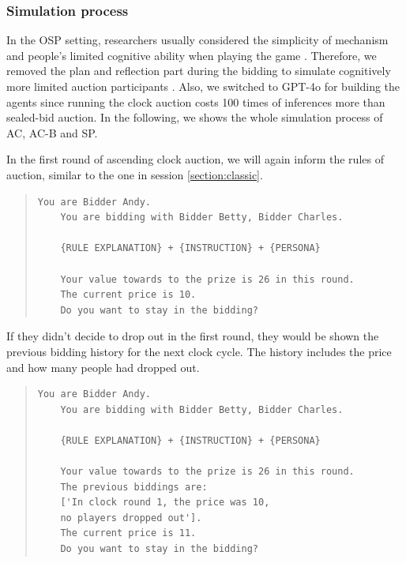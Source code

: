 \documentclass{article} %
\begin{document}
\subsubsection{Simulation process}



In the OSP setting, researchers usually considered the simplicity of mechanism and people's limited cognitive ability when playing the game \cite{li2017obviously}. 
Therefore, we removed the plan and reflection part during the bidding to simulate cognitively more limited auction participants \cite{raman2024steerassessingeconomicrationality}. Also, we switched to GPT-4o for building the agents since running the clock auction costs 100 times of inferences more than sealed-bid auction.
In the following, we shows the whole simulation process of AC, AC-B and SP. 

In the first round of ascending clock auction, we will again inform the rules of auction, similar to the one in session \ref{section:classic}. 

\begin{quote}
\begin{lstlisting}[basicstyle=\ttfamily]
    You are Bidder Andy.            
    You are bidding with Bidder Betty, Bidder Charles.     
    
    {RULE EXPLANATION} + {INSTRUCTION} + {PERSONA} 

    Your value towards to the prize is 26 in this round.
    The current price is 10. 
    Do you want to stay in the bidding?
\end{lstlisting}
\end{quote}

If they didn't decide to drop out in the first round, they would be shown the previous bidding history for the next clock cycle. The history includes the price and how many people had dropped out.
\begin{quote}
\begin{lstlisting}[basicstyle=\ttfamily]
    You are Bidder Andy.            
    You are bidding with Bidder Betty, Bidder Charles.     
    
    {RULE EXPLANATION} + {INSTRUCTION} + {PERSONA} 

    Your value towards to the prize is 26 in this round.
    The previous biddings are: 
    ['In clock round 1, the price was 10, 
    no players dropped out'].
    The current price is 11. 
    Do you want to stay in the bidding?
\end{lstlisting}
\end{quote}
\end{document}
